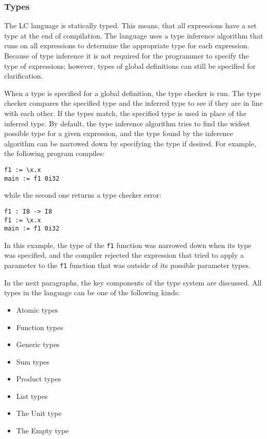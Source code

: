 \documentclass[12pt]{article}
\begin{document}
\subsubsection{Types}

The LC language is statically typed. This means, that all expressions have a
set type at the end of compilation. The language uses a type inference algorithm
that runs on all expressions to determine the appropriate type for each
expression. Because of type inference it is not required for the programmer to
specify the type of expressions; however, types of global definitions can still 
be specified for clarification.

When a type is specified for a global definition, the type checker is run. The
type checker compares the specified type and the inferred type to see if they
are in line with each other. If the types match, the specified type is used in
place of the inferred type. By default, the type inference algorithm tries to
find the widest possible type for a given expression, and the type found by the
inference algorithm can be narrowed down by specifying the type if desired. For
example, the following program compiles:
\begin{lstlisting}
f1 := \x.x
main := f1 0i32
\end{lstlisting}
while the second one returns a type checker error:
\begin{lstlisting}
f1 : I8 -> I8
f1 := \x.x
main := f1 0i32
\end{lstlisting}
In this example, the type of the \verb$f1$ function was narrowed down when its
type was specified, and the compiler rejected the expression that tried to apply
a parameter to the \verb$f1$ function that was outside of its possible parameter
types.

In the next paragraphs, the key components of the type system are discussed. All
types in the language can be one of the following kinds:
\begin{itemize}
    \item Atomic types
    \item Function types
    \item Generic types
    \item Sum types
    \item Product types
    \item List types
    \item The Unit type
    \item The Empty type
\end{itemize}
\end{document}
